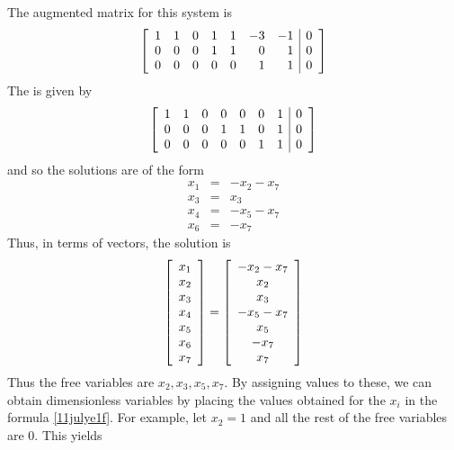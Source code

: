 The augmented matrix for this system is 
\begin{equation*}
\left[
\begin{array}{rrrrrrr|r}
1 & 1 & 0 & 1 & 1 & -3 & -1 & 0 \\ 
0 & 0 & 0 & 1 & 1 & 0 & 1 & 0 \\ 
0 & 0 & 0 & 0 & 0 & 1 & 1 & 0
\end{array}
\right]
\end{equation*}
The \rref \;is given by 
\begin{equation*}
\left[ 
\begin{array}{rrrrrrr|r}
1 & 1 & 0 & 0 & 0 & 0 & 1 & 0 \\ 
0 & 0 & 0 & 1 & 1 & 0 & 1 & 0 \\ 
0 & 0 & 0 & 0 & 0 & 1 & 1 & 0
\end{array}
\right]
\end{equation*}
and so the solutions are of the form 
\begin{eqnarray*}
x_{1} &=& -x_{2}-x_{7} \\
x_{3} &=& x_{3} \\
x_{4} &=& -x_{5}-x_{7} \\
x_{6} &=& -x_{7}
\end{eqnarray*}
Thus, in terms of vectors, the solution is 
\begin{equation*}
\left[ 
\begin{array}{c}
x_{1} \\ 
x_{2} \\ 
x_{3} \\ 
x_{4} \\ 
x_{5} \\ 
x_{6} \\ 
x_{7}
\end{array}
\right] =\left[ 
\begin{array}{c}
-x_{2}-x_{7} \\ 
x_{2} \\ 
x_{3} \\ 
-x_{5}-x_{7} \\ 
x_{5} \\ 
-x_{7} \\ 
x_{7}
\end{array}
\right]
\end{equation*}
Thus the free variables are $x_{2},x_{3},x_{5},x_{7}.$ By assigning values
to these, we can obtain dimensionless variables by placing the values
obtained for the $x_{i}$ in the formula \ref{11julye1f}. For example, let 
$x_{2}=1$ and all the rest of the free variables are 0. This yields 
